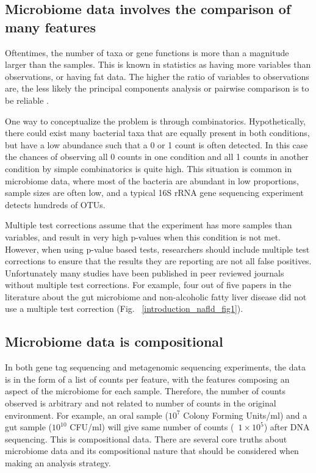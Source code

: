 \subsection{Microbiome data involves the comparison of many features}
Oftentimes, the number of taxa or gene functions is more than a magnitude larger than the samples. This is known in statistics as having more variables than observations, or having fat data. The higher the ratio of variables to observations are, the less likely the principal components analysis or pairwise comparison is to be reliable \cite{osborne2004sample}.

One way to conceptualize the problem is through combinatorics. Hypothetically, there could exist many bacterial taxa that are equally present in both conditions, but have a low abundance such that a 0 or 1 count is often detected. In this case the chances of observing all 0 counts in one condition and all 1 counts in another condition by simple combinatorics is quite high. This situation is common in microbiome data, where most of the bacteria are abundant in low proportions, sample sizes are often low, and a typical 16S rRNA gene sequencing experiment detects hundreds of OTUs.

Multiple test corrections assume that the experiment has more samples than variables, and result in very high p-values when this condition is not met. However, when using p-value based tests, researchers should include multiple test corrections to ensure that the results they are reporting are not all false positives. Unfortunately many studies have been published in peer reviewed journals without multiple test corrections. For example, four out of five papers in the literature about the gut microbiome and non-alcoholic fatty liver disease did not use a multiple test correction (Fig. ~\ref{introduction_nafld_fig1}).

\subsection{Microbiome data is compositional}
In both gene tag sequencing and metagenomic sequencing experiments, the data is in the form of a list of counts per feature, with the features composing an aspect of the microbiome for each sample. Therefore, the number of counts observed is arbitrary and not related to number of counts in the original environment. For example, an oral sample ($10^{7}$ Colony Forming Units/ml) and a gut sample ($10^{10}$ CFU/ml) will give same number of counts (~$1 \times 10^{5}$) after DNA sequencing. This is compositional data. There are several core truths about microbiome data and its compositional nature that should be considered when making an analysis strategy.

